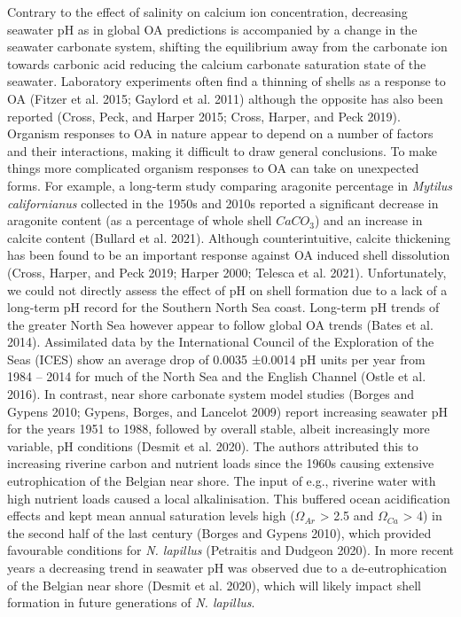 \documentclass[smallextended]{svjour3}       %
\begin{document}
Contrary to the effect of salinity on calcium ion concentration,
decreasing seawater pH as in global OA predictions is accompanied by a
change in the seawater carbonate system, shifting the equilibrium away
from the carbonate ion towards carbonic acid reducing the calcium
carbonate saturation state of the seawater. Laboratory experiments often
find a thinning of shells as a response to OA (Fitzer et al. 2015;
Gaylord et al. 2011) although the opposite has also been reported
(Cross, Peck, and Harper 2015; Cross, Harper, and Peck 2019). Organism
responses to OA in nature appear to depend on a number of factors and
their interactions, making it difficult to draw general conclusions. To
make things more complicated organism responses to OA can take on
unexpected forms. For example, a long-term study comparing aragonite
percentage in \emph{Mytilus californianus} collected in the 1950s and
2010s reported a significant decrease in aragonite content (as a
percentage of whole shell \(CaCO_3\)) and an increase in calcite content
(Bullard et al. 2021). Although counterintuitive, calcite thickening has
been found to be an important response against OA induced shell
dissolution (Cross, Harper, and Peck 2019; Harper 2000; Telesca et al.
2021). Unfortunately, we could not directly assess the effect of pH on
shell formation due to a lack of a long-term pH record for the Southern
North Sea coast. Long-term pH trends of the greater North Sea however
appear to follow global OA trends (Bates et al. 2014). Assimilated data
by the International Council of the Exploration of the Seas (ICES) show
an average drop of 0.0035 ±0.0014 pH units per year from 1984 -- 2014
for much of the North Sea and the English Channel (Ostle et al. 2016).
In contrast, near shore carbonate system model studies (Borges and
Gypens 2010; Gypens, Borges, and Lancelot 2009) report increasing
seawater pH for the years 1951 to 1988, followed by overall stable,
albeit increasingly more variable, pH conditions (Desmit et al. 2020).
The authors attributed this to increasing riverine carbon and nutrient
loads since the 1960s causing extensive eutrophication of the Belgian
near shore. The input of e.g., riverine water with high nutrient loads
caused a local alkalinisation. This buffered ocean acidification effects
and kept mean annual saturation levels high (\(\Omega_{Ar}\)
\textgreater{} 2.5 and \(\Omega_{Ca}\) \textgreater{} 4) in the second
half of the last century (Borges and Gypens 2010), which provided
favourable conditions for \emph{N. lapillus} (Petraitis and Dudgeon
2020). In more recent years a decreasing trend in seawater pH was
observed due to a de-eutrophication of the Belgian near shore (Desmit et
al. 2020), which will likely impact shell formation in future
generations of \emph{N. lapillus}.
\end{document}

